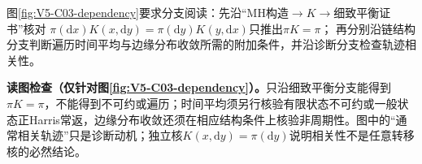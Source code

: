 \documentclass[UTF8,a4paper,11pt,openany]{ctexbook}
\begin{document}
\setcounter{page}{595}
\setcounter{chapter}{32}
\setcounter{figure}{0}
\pagestyle{headings}
图\ref{fig:V5-C03-dependency}要求分支阅读：先沿“MH构造$\to K\to$细致平衡证书”核对
$\pi(\mathrm dx)K(x,\mathrm dy)=\pi(\mathrm dy)K(y,\mathrm dx)$只推出$\pi K=\pi$；
再分别沿链结构分支判断遍历时间平均与边缘分布收敛所需的附加条件，并沿诊断分支检查轨迹相关性。

\FloatBarrier
\noindent\textbf{读图检查（仅针对图\ref{fig:V5-C03-dependency}）。}只沿细致平衡分支能得到$\pi K=\pi$，不能得到不可约或遍历；时间平均须另行核验有限状态不可约或一般状态正Harris常返，边缘分布收敛还须在相应结构条件上核验非周期性。图中的“通常相关轨迹”只是诊断动机；独立核$K(x,\mathrm dy)=\pi(\mathrm dy)$说明相关性不是任意转移核的必然结论。
\end{document}
